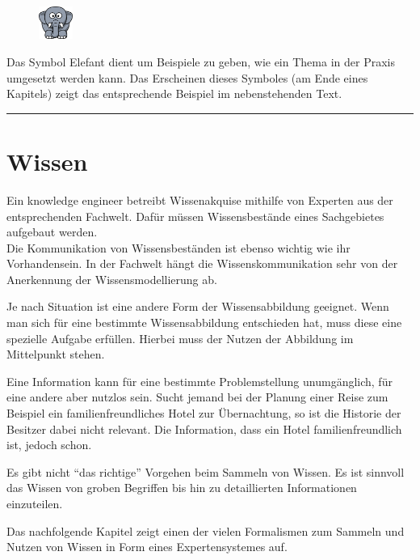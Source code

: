\vspace{30pt}

\begin{figure}
    \vspace{-12pt}
    \includegraphics[width=0.1\textwidth]{bilder/elephant.png}\protect\footnotemark{}
\end{figure}
Das Symbol Elefant dient um Beispiele zu geben, wie ein Thema in der Praxis umgesetzt werden kann. Das Erscheinen dieses Symboles (am Ende eines Kapitels) zeigt das entsprechende Beispiel im nebenstehenden Text.\\

\noindent\rule[1ex]{\textwidth}{1pt}

\newpage

\section{Wissen}
\label{chap:einleitung_wissen}
Ein knowledge engineer betreibt Wissenakquise mithilfe von Experten aus der entsprechenden Fachwelt. Dafür müssen Wissensbestände eines Sachgebietes aufgebaut werden. \\
Die Kommunikation von Wissensbeständen ist ebenso wichtig wie ihr Vorhandensein. In der Fachwelt hängt die Wissenskommunikation sehr von der Anerkennung der Wissensmodellierung ab.

Je nach Situation ist eine andere Form der Wissensabbildung geeignet. Wenn man sich für eine bestimmte Wissensabbildung entschieden hat, muss diese eine spezielle Aufgabe erfüllen. Hierbei muss der Nutzen der Abbildung im Mittelpunkt stehen.

Eine Information kann für eine bestimmte Problemstellung unumgänglich, für eine andere aber nutzlos sein. Sucht jemand bei der Planung einer Reise zum Beispiel ein familienfreundliches Hotel zur Übernachtung, so ist die Historie der Besitzer dabei nicht relevant. Die Information, dass ein Hotel familienfreundlich ist, jedoch schon.

Es gibt nicht ``das richtige'' Vorgehen beim Sammeln von Wissen. Es ist sinnvoll das Wissen von groben Begriffen bis hin zu detaillierten Informationen einzuteilen.

Das nachfolgende Kapitel zeigt einen der vielen Formalismen zum Sammeln und Nutzen von Wissen in Form eines Expertensystemes auf.
